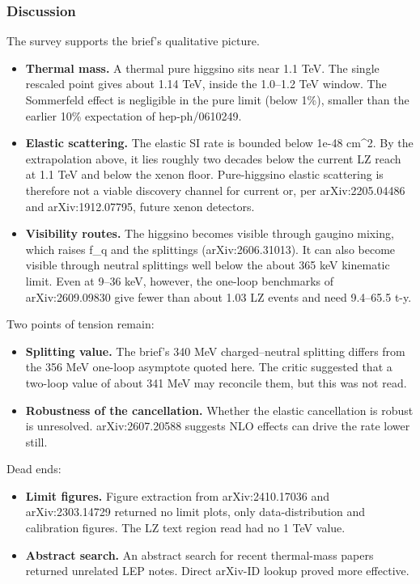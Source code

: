 \documentclass[11pt,a4paper]{article}
\begin{document}
\subsubsection*{Discussion}
The survey supports the brief's qualitative picture.

\begin{itemize}
  \item \textbf{Thermal mass.} A thermal pure higgsino sits near 1.1 TeV. The single rescaled point gives about 1.14 TeV, inside the 1.0--1.2 TeV window. The Sommerfeld effect is negligible in the pure limit (below 1\%), smaller than the earlier 10\% expectation of hep-ph/0610249.
  \item \textbf{Elastic scattering.} The elastic SI rate is bounded below 1e-48 cm\textasciicircum{}2. By the extrapolation above, it lies roughly two decades below the current LZ reach at 1.1 TeV and below the xenon floor. Pure-higgsino elastic scattering is therefore not a viable discovery channel for current or, per arXiv:2205.04486 and arXiv:1912.07795, future xenon detectors.
  \item \textbf{Visibility routes.} The higgsino becomes visible through gaugino mixing, which raises f\_q and the splittings (arXiv:2606.31013). It can also become visible through neutral splittings well below the about 365 keV kinematic limit. Even at 9--36 keV, however, the one-loop benchmarks of arXiv:2609.09830 give fewer than about 1.03 LZ events and need 9.4--65.5 t-y.
\end{itemize}
Two points of tension remain:

\begin{itemize}
  \item \textbf{Splitting value.} The brief's 340 MeV charged--neutral splitting differs from the 356 MeV one-loop asymptote quoted here. The critic suggested that a two-loop value of about 341 MeV may reconcile them, but this was not read.
  \item \textbf{Robustness of the cancellation.} Whether the elastic cancellation is robust is unresolved. arXiv:2607.20588 suggests NLO effects can drive the rate lower still.
\end{itemize}
Dead ends:

\begin{itemize}
  \item \textbf{Limit figures.} Figure extraction from arXiv:2410.17036 and arXiv:2303.14729 returned no limit plots, only data-distribution and calibration figures. The LZ text region read had no 1 TeV value.
  \item \textbf{Abstract search.} An abstract search for recent thermal-mass papers returned unrelated LEP notes. Direct arXiv-ID lookup proved more effective.
\end{itemize}
\end{document}
